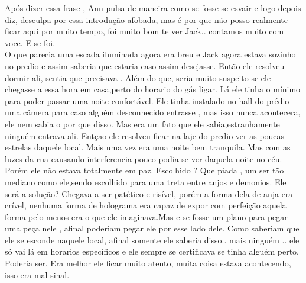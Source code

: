 \documentclass{book}
\begin{document}
 Após dizer essa frase , Ann pulsa de maneira como se fosse se esvair e logo depois diz, desculpa por essa introdução afobada, mas é por que não posso realmente ficar aqui por muito tempo, foi muito bom te ver Jack.. contamos muito com voce. E se foi. \\
 O que parecia uma escada iluminada agora era breu e Jack agora estava sozinho no predio e assim saberia que estaria caso assim desejasse. Então ele resolveu dormir ali, sentia que precisava . Além do que, seria muito suspeito se ele chegasse a essa hora em casa,perto do horario do gás ligar. Lá ele tinha o mínimo para poder passar uma noite confortável. Ele tinha instalado no hall do prédio uma câmera para caso alguém desconhecido entrasse , mas isso nunca acontecera, ele nem sabia o por que disso. Mas era um fato que ele sabia,estranhamente ninguém entrava ali. Entçao ele resolveu ficar na laje do predio ver as poucas estrelas daquele local. Mais uma vez era uma noite bem tranquila. Mas com as luzes da rua causando interferencia pouco podia se ver daquela noite no céu. Porém ele não estava totalmente em paz. Escolhido ? Que piada , um ser tão mediano como ele,sendo escolhido para uma treta entre anjos e demonios. Ele será a solução? Chegava a ser patético e risível, porém a forma dela de anja era crível, nenhuma forma de holograma era capaz de expor com perfeição aquela forma pelo menos era o que ele imaginava.Mas e se fosse um plano para pegar uma peça nele , afinal poderiam pegar ele por esse lado dele. Como saberiam que ele se esconde naquele local, afinal somente ele saberia disso.. mais ninguém .. ele só vai lá em horarios específicos e ele sempre se certificava se tinha alguém perto. Poderia ser. Era melhor ele ficar muito atento, muita coisa estava acontecendo, isso era mal sinal.\\
 
\end{document}
